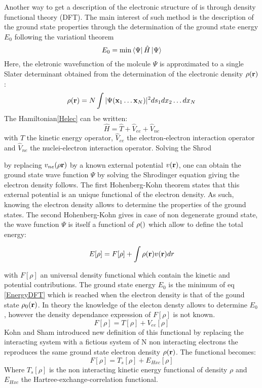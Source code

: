 \documentclass{article}
\begin{document}
Another way to get a description of the electronic structure of is through density functional theory (DFT).
The main interest of such method is the description of the ground state properties through the determination of the ground state energy $E_0$ following the variationl theorem
\begin{equation}
    E_0 = \min \bra{\Psi} \hat{H} \ket{\Psi}
\end{equation}
Here, the eletronic wavefunction of the molcule $\Psi$ is approximated to a single Slater determinant obtained from the determination of the electronic density $\rho(\vb r)$:
\begin{equation}
    \rho(\vb r)=N\int |\Psi(\vb x_1 \ldots \vb x_N)|^2 ds_1 dx_2 \ldots dx_N
\end{equation}
The Hamiltonian\ref{Helec} can be written:
\begin{equation}\label{Hop}
    \hat{H}=\hat{T} + \hat{V}_{ee} + \hat{V}_{ne}
\end{equation} 
with $\hat{T}$ the kinetic energy operator, $\hat{V}_{ee}$ the electron-electron interaction operator and $\hat{V}_{ne}$ the nuclei-electron interaction operator. 
Solving the Shrod

by replacing $v_{ne}(\rho\vb r)$ by a known external potential $v(\vb r)$, one can obtain the ground state wave function $\Psi$ by solving the Shrodinger equation giving the electron density follows.
The first Hohenberg-Kohn theorem states that this external potential is an unique functional of the electron density.
As such, knowing the electron density allows to determine the properties of the ground states.
The second Hohenberg-Kohn gives in case of non degenerate ground state, the wave function $\Psi$ is itself a functionl of $\rho(\vb)$ which allow to define the total energy:

\begin{equation}\label{EnergyDFT}
    E[\rho]= F[\rho]+ \int \rho(\vb r) v(\vb r)dr
\end{equation}

with $F[\rho]$ an universal density functional which contain the kinetic and potential contributions.
The ground state energy $E_0$ is the minimum of eq \ref{EnergyDFT} which is reached when the electron density is that of the gound state $\rho_0(\vb r)$.
In theory the knowledge of the electon densty allows to determine $E_0$, however the density dependance expression of $F[\rho]$ is not known.
\begin{equation}
    F[\rho]=T[\rho]+V_{ee}[\rho]
\end{equation}
Kohn and Sham introduced new definition of this functional by replacing the interacting system with a fictious system of N non interacting electrons the reproduces the same ground state electron density $\rho(\vb r)$.
The functional becomes:
\begin{equation}
    F[\rho]=T_s[\rho]+E_{Hxc}[\rho]
\end{equation}
Where $T_s[\rho]$ is the non interacting kinetic energy functional of density $\rho$ and $E_{Hxc}$ the Hartree-exchange-correlation functional.
\end{document}
